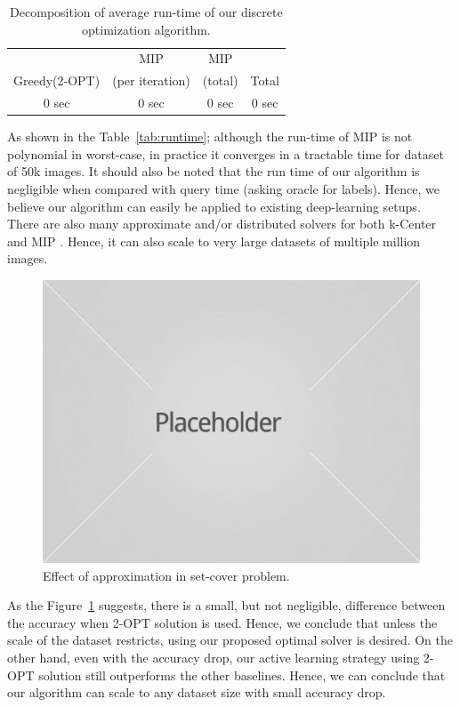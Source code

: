 \documentclass{article}
\begin{document}
\begin{table}[ht]
\centering
\caption{Decomposition of average run-time of our discrete optimization algorithm.}
\begin{tabular}{cccc} \toprule
 & MIP & MIP &  \\
Greedy(2-OPT) & (per iteration) & (total) & Total \\ \midrule
0 sec  & 0 sec & 0 sec & 0 sec \\ \bottomrule
\end{tabular}
\end{table}

As shown in the Table~\ref{tab:runtime}; although the run-time of MIP is not polynomial in worst-case, in practice it converges in a tractable time for dataset of 50k images. It should also be noted that the run time of our algorithm is negligible when compared with query time (asking oracle for labels). Hence, we believe our algorithm can easily be applied to existing deep-learning setups. There are also many approximate and/or distributed solvers for both k-Center and MIP \cite{kcenterdist,gurobi}. Hence, it can also scale to very large datasets of multiple million images.
 
 \begin{figure}[ht]
\includegraphics[width=\columnwidth]{placeholder1.jpg}
\caption{Effect of approximation in set-cover problem.}
\label{fig:twoopt}
\end{figure}

As the Figure~\ref{fig:twoopt} suggests, there is a small, but not negligible, difference between the accuracy when 2-OPT solution is used. Hence, we conclude that unless the scale of the dataset restricts, using our proposed optimal solver is desired. On the other hand, even with the accuracy drop, our active learning strategy using 2-OPT solution still outperforms the other baselines. Hence, we can conclude that our algorithm can scale to any dataset size with small accuracy drop.
\end{document}
